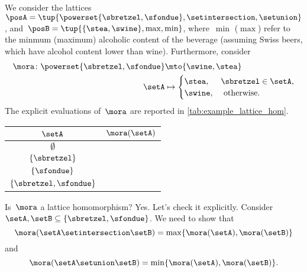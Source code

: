 \begin{example}
	We consider the lattices~$\posA=\tup{\powerset \{\sbretzel,\sfondue\}, \setintersection, \setunion}$, and~$\posB=\tup{\{\stea, \swine\}, \max, \min}$, where~$\min$ ($\max$) refer to the minmum (maximum) alcoholic content of the beverage (assuming Swiss beers, which have alcohol content lower than wine).
	Furthermore, consider
	\begin{equation}
		\label{eq:example_lat_hom_a}
		\begin{aligned}
			\mora\colon \powerset \{\sbretzel,\sfondue\} & \mto \{\swine, \stea\}            \\
			\setA                                        & \mapsto \begin{cases}
				\stea,  & \sbretzel \in \setA, \\
				\swine, & \text{ otherwise}.
			\end{cases}
		\end{aligned}
	\end{equation}
	The explicit evaluations of~$\mora$ are reported in \cref{tab:example_lattice_hom}.
	\begin{margintable}
		\begin{center}
			\begin{tabular}{c|c}
				$\setA$                    & $\mora(\setA)$ \\
				\midrule
				$\emptyset$                & \swine         \\
				$\{\sbretzel\}$            & \stea          \\
				$\{\sfondue\}$             & \swine         \\
				$\{ \sbretzel, \sfondue\}$ & \stea
			\end{tabular}
		\end{center}
		\caption{\label{tab:example_lattice_hom}}
	\end{margintable}

	Is~$\mora$ a lattice homomorphism?
	Yes.
	Let's check it explicitly.
	Consider~$\setA,\setB\subseteq \{\sbretzel, \sfondue\}$.
	We need to show that
	\begin{equation}
		\label{eq:hom_lat_cond_a}
		\mora(\setA\setintersection \setB)=\max\{\mora(\setA),\mora(\setB)\}\\
	\end{equation}
	and
	\begin{equation}
		\label{eq:hom_lat_cond_b}
		\mora(\setA\setunion \setB)=\min\{\mora(\setA),\mora(\setB)\}.
	\end{equation}


\end{example}
